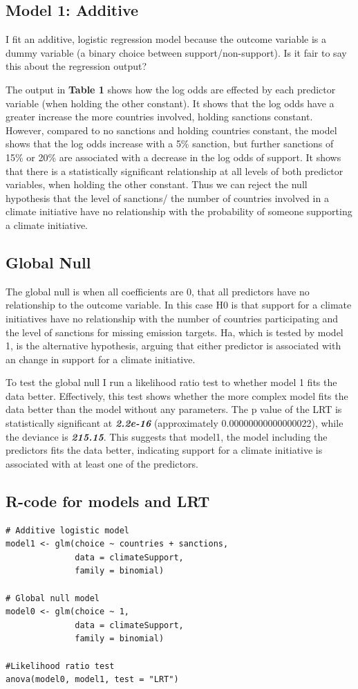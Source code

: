 \documentclass[12pt,letterpaper]{article}
\begin{document}
\subsection{Model 1: Additive}
I fit an additive, logistic regression model  because the outcome variable is a dummy variable (a binary choice between support/non-support). Is it fair to say this about the regression output?

The output in \textbf{Table 1} shows how the log odds are effected by each predictor variable (when holding the other constant). It shows that the log odds have a greater increase the more countries involved, holding sanctions constant. However, compared to no sanctions and holding countries constant, the model shows that the log odds increase with a 5\% sanction, but further sanctions of 15\% or 20\% are associated with a decrease in the log odds of support.
It shows that there is a statistically significant relationship at all levels of both predictor variables, when holding the other constant. Thus we can reject the null hypothesis that the level of sanctions/ the number of countries involved in a climate initiative have no relationship with the probability of someone supporting a climate initiative.

\subsection{Global Null}
The global null is when all coefficients are 0, that all predictors have no relationship to the outcome variable. In this case H0 is that support for a climate initiatives have no relationship with the number of countries participating and the level of sanctions for missing emission targets. Ha, which is tested by model 1, is the alternative hypothesis, arguing that either predictor is associated with an change in support for a climate initiative.

To test the global null I run a likelihood ratio test to whether model 1 fits the data better. Effectively, this test shows whether the more complex model fits the data better than the model without any parameters. The p value of the LRT is statistically significant at \textit{\textbf{2.2e-16}}  (approximately 0.00000000000000022), while the deviance is \textbf{\textit{215.15}}. This suggests that model1, the model including the predictors fits the data better, indicating support for a climate initiative is associated with at least one of the predictors.

\subsection{R-code for models and LRT}
\begin{verbatim}
# Additive logistic model
model1 <- glm(choice ~ countries + sanctions,
              data = climateSupport,
              family = binomial)
              
# Global null model
model0 <- glm(choice ~ 1,
              data = climateSupport,
              family = binomial)
              
#Likelihood ratio test
anova(model0, model1, test = "LRT")
\end{verbatim}
\end{document}
